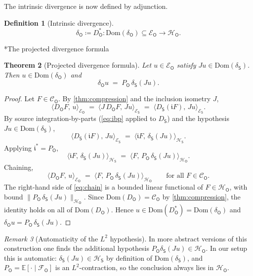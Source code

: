 \documentclass[11pt,reqno]{amsart}
\makeatletter
\renewcommand\subsection{\@startsection{subsection}{2}%
  \z@{.7\linespacing}{.5\linespacing}%
  {\normalfont\centering\scshape}}
\theoremstyle{plain}
\newtheorem{theorem}{Theorem}[section]
\theoremstyle{definition}
\newtheorem{definition}[theorem]{Definition}
\theoremstyle{remark}
\newtheorem{remark}[theorem]{Remark}
\newcommand{\E}{\mathbb{E}}
\newcommand{\Hilb}{\mathcal{H}}
\newcommand{\Dom}{\mathrm{Dom}}
\newcommand{\Energy}{\mathcal{E}}
\newcommand{\Source}{\mathsf{S}}
\newcommand{\Obs}{\mathsf{O}}
\renewcommand{\iota}{\mathfrak{i}}
\makeatother
\begin{document}
The intrinsic divergence is now defined by adjunction.

\begin{definition}[Intrinsic divergence]\label{def:int-div}
\[
  \delta_\Obs\coloneqq D_\Obs^{*}\colon\Dom(\delta_\Obs)\subseteq\Energy_\Obs
  \longrightarrow\Hilb_\Obs.
\]
\end{definition}

\subsection*{The projected divergence formula}

\begin{theorem}[Projected divergence formula]\label{thm:proj-div}
Let $u\in\Energy_\Obs$ satisfy $Ju\in\Dom(\delta_\Source)$. Then
$u\in\Dom(\delta_\Obs)$ and
\begin{equation}\label{eq:proj-div}
  \delta_\Obs u \;=\; P_\Obs\,\delta_\Source(Ju).
\end{equation}
\end{theorem}

\begin{proof}
Let $F\in\mathcal C_\Obs$. By \cref{thm:compression} and the inclusion
isometry $J$,
\[
  \langle D_\Obs F,\,u\rangle_{\Energy_\Obs}
  \;=\;\langle J\,D_\Obs F,\,Ju\rangle_{\Energy_\Source}
  \;=\;\langle D_\Source(\iota F),\,Ju\rangle_{\Energy_\Source}.
\]
By source integration-by-parts (\cref{eq:ibp} applied to $D_\Source$)
and the hypothesis $Ju\in\Dom(\delta_\Source)$,
\[
  \langle D_\Source(\iota F),\,Ju\rangle_{\Energy_\Source}
  \;=\;\langle\iota F,\,\delta_\Source(Ju)\rangle_{\Hilb_\Source}.
\]
Applying $\iota^{*}=P_\Obs$,
\[
  \langle\iota F,\,\delta_\Source(Ju)\rangle_{\Hilb_\Source}
  \;=\;\langle F,\,P_\Obs\,\delta_\Source(Ju)\rangle_{\Hilb_\Obs}.
\]
Chaining,
\begin{equation}\label{eq:chain}
  \langle D_\Obs F,\,u\rangle_{\Energy_\Obs}
  \;=\;\langle F,\,P_\Obs\,\delta_\Source(Ju)\rangle_{\Hilb_\Obs}
  \qquad\text{for all }F\in\mathcal C_\Obs.
\end{equation}
The right-hand side of \cref{eq:chain} is a bounded linear functional of
$F\in\Hilb_\Obs$, with bound
$\|P_\Obs\,\delta_\Source(Ju)\|_{\Hilb_\Obs}$. Since
$\Dom(D_\Obs)=\mathcal C_\Obs$ by \cref{thm:compression}, the identity
holds on all of $\Dom(D_\Obs)$. Hence $u\in\Dom(D_\Obs^{*})=
\Dom(\delta_\Obs)$ and $\delta_\Obs u=P_\Obs\,\delta_\Source(Ju)$.
\end{proof}

\begin{remark}[Automaticity of the $L^{2}$ hypothesis]
\label{rem:l2-auto}
In more abstract versions of this construction one finds the additional
hypothesis $P_\Obs\delta_\Source(Ju)\in\Hilb_\Obs$. In our setup this is
automatic: $\delta_\Source(Ju)\in\Hilb_\Source$ by definition of
$\Dom(\delta_\Source)$, and $P_\Obs=\E[\cdot\mid\mathcal F_\Obs]$ is an
$L^{2}$-contraction, so the conclusion always lies in $\Hilb_\Obs$.
\end{remark}
\end{document}
